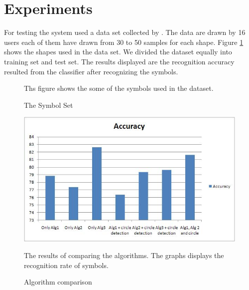 \documentclass[a4paper,10pt]{IEEEconf}
\begin{document}
\section{Experiments}\label{sec:Experiments}
For testing the system used a data set collected by \citeauthor{HeloiseBeautification}. The data are drawn by 16 users each of them have drawn from 30 to 50 samples for each shape. Figure \ref{fig:symbolSet} shows the shapes used in the data set. We divided the dataset equally into training set and test set.  The results displayed are the recognition accuracy resulted from the classifier after recognizing the symbols. \\
\begin{figure}[]\centering
{}
	\caption{The Symbol Set} Ths figure shows the some of the symbols used in the dataset. 
	\label{fig:symbolSet}
\end{figure}
\begin{figure}[]
	\centering
		\includegraphics[scale=0.5]{images/test1.jpg}
	\caption{Algorithm comparison} The results of comparing the algorithms. The graphs displays the recognition rate of symbols. 
	\label{fig:test1}
\end{figure}
\end{document}
